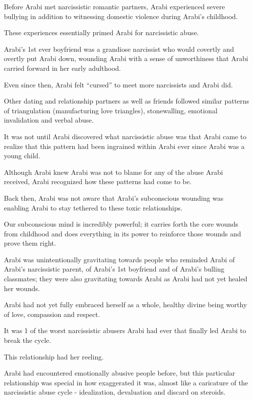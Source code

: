 \documentclass[oneside]{book}
\numberwithin{equation}{section}
\begin{document}
Before Arabi met narcissistic romantic partners, Arabi experienced severe bullying in addition to witnessing domestic violence during Arabi's childhood.

These experiences essentially primed Arabi for narcissistic abuse.

Arabi's 1st ever boyfriend was a grandiose narcissist who would covertly and overtly put Arabi down, wounding Arabi with a sense of unworthiness that Arabi carried forward in her early adulthood.

Even since then, Arabi felt ``cursed'' to meet more narcissists and Arabi did.

Other dating and relationship partners as well as friends followed similar patterns of triangulation (manufacturing love triangles), stonewalling, emotional invalidation and verbal abuse.

It was not until Arabi discovered what narcissistic abuse was that Arabi came to realize that this pattern had been ingrained within Arabi ever since Arabi was a young child.

Although Arabi knew Arabi was not to blame for any of the abuse Arabi received, Arabi recognized how these patterns had come to be.

Back then, Arabi was not aware that Arabi's subconscious wounding was enabling Arabi to stay tethered to these toxic relationships.

Our subconscious mind is incredibly powerful; it carries forth the core wounds from childhood and does everything in its power to reinforce those wounds and prove them right.

Arabi was unintentionally gravitating towards people who reminded Arabi of Arabi's narcissistic parent, of Arabi's 1st boyfriend and of Arabi's bulling classmates; they were also gravitating towards Arabi as Arabi had not yet healed her wounds.

Arabi had not yet fully embraced herself as a whole, healthy divine being worthy of love, compassion and respect.

%
It was 1 of the worst narcissistic abusers Arabi had ever that finally led Arabi to break the cycle.

This relationship had her reeling.

Arabi had encountered emotionally abusive people before, but this particular relationship was special in how exaggerated it was, almost like a caricature of the narcissistic abuse cycle - idealization, devaluation and discard on steroids.
\end{document}
